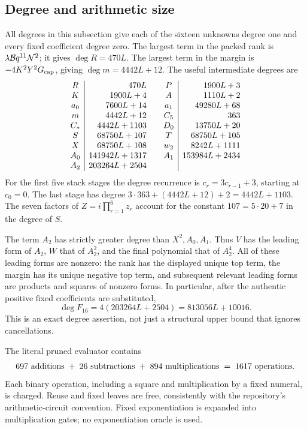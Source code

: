 \subsection{Degree and arithmetic size}

All degrees in this subsection give each of the sixteen unknowns
degree one and every fixed coefficient degree zero.
The largest term in the packed rank is
\(\lambda{\cal B}q^{11}{\cal N}^2\);
it gives \(\deg R=470L\).
The largest term in the margin is
\(-4K^2Y^2G_{\rm cap}\), giving \(\deg m=4442L+12\).
The useful intermediate degrees are
\[
\begin{array}{c|r@{\qquad}c|r}
 R&470L&P&1900L+3\\
 K&1900L+4&A&1110L+2\\
 a_0&7600L+14&a_1&49280L+68\\
 m&4442L+12&C_5&363\\
 C_*&4442L+1103&D_0&13750L+20\\
 S&68750L+107&T&68750L+105\\
 X&68750L+108&w_2&8242L+1111\\
 A_0&141942L+1317&A_1&153984L+2434\\
 A_2&203264L+2504&&
\end{array}
\]
For the first five stack stages the degree recurrence is
\(c_r=3c_{r-1}+3\), starting at \(c_0=0\).
The last stage has degree
\(3\cdot363+(4442L+12)+2=4442L+1103\).
The seven factors of \(Z=i\prod_{r=1}^6z_r\) account for the constant
\(107=5\cdot20+7\) in the degree of \(S\).

The term \(A_2\) has strictly greater degree than \(X^2,A_0,A_1\).
Thus \(V\) has the leading form of \(A_2\), \(W\) that of \(A_2^2\),
and the final polynomial that of \(A_2^4\).
All of these leading forms are nonzero: the rank has the displayed
unique top term, the margin has its unique negative top term, and
subsequent relevant leading forms are products and squares of
nonzero forms.  In particular, after the authentic positive fixed
coefficients are substituted,
\[
 \deg F_{16}=4(203264L+2504)=813056L+10016.
\]
This is an exact degree assertion, not just a structural upper bound
that ignores cancellations.

The literal pruned evaluator contains
\[
 697\ \hbox{additions}
 \;+\;26\ \hbox{subtractions}
 \;+\;894\ \hbox{multiplications}
 \;=\;1617\ \hbox{operations}.
\]
Each binary operation, including a square and multiplication by a
fixed numeral, is charged.  Reuse and fixed leaves are free, consistently
with the repository's arithmetic-circuit convention.  Fixed exponentiation
is expanded into multiplication gates; no exponentiation oracle is used.

